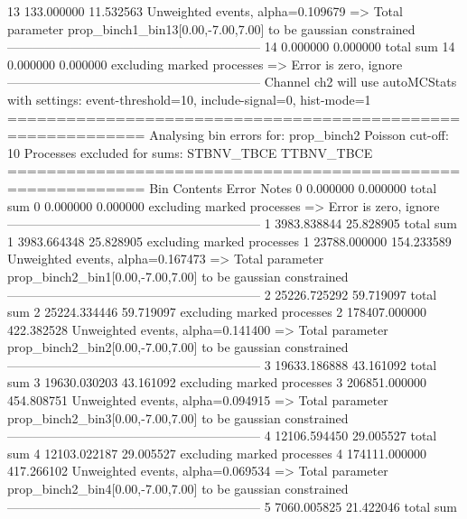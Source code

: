 13         133.000000      11.532563       Unweighted events, alpha=0.109679
  => Total parameter prop_binch1_bin13[0.00,-7.00,7.00] to be gaussian constrained
------------------------------------------------------------
14         0.000000        0.000000        total sum                     
14         0.000000        0.000000        excluding marked processes    
  => Error is zero, ignore      
------------------------------------------------------------
Channel ch2 will use autoMCStats with settings: event-threshold=10, include-signal=0, hist-mode=1
============================================================
Analysing bin errors for: prop_binch2
Poisson cut-off: 10
Processes excluded for sums: STBNV_TBCE TTBNV_TBCE
============================================================
Bin        Contents        Error           Notes                         
0          0.000000        0.000000        total sum                     
0          0.000000        0.000000        excluding marked processes    
  => Error is zero, ignore      
------------------------------------------------------------
1          3983.838844     25.828905       total sum                     
1          3983.664348     25.828905       excluding marked processes    
1          23788.000000    154.233589      Unweighted events, alpha=0.167473
  => Total parameter prop_binch2_bin1[0.00,-7.00,7.00] to be gaussian constrained
------------------------------------------------------------
2          25226.725292    59.719097       total sum                     
2          25224.334446    59.719097       excluding marked processes    
2          178407.000000   422.382528      Unweighted events, alpha=0.141400
  => Total parameter prop_binch2_bin2[0.00,-7.00,7.00] to be gaussian constrained
------------------------------------------------------------
3          19633.186888    43.161092       total sum                     
3          19630.030203    43.161092       excluding marked processes    
3          206851.000000   454.808751      Unweighted events, alpha=0.094915
  => Total parameter prop_binch2_bin3[0.00,-7.00,7.00] to be gaussian constrained
------------------------------------------------------------
4          12106.594450    29.005527       total sum                     
4          12103.022187    29.005527       excluding marked processes    
4          174111.000000   417.266102      Unweighted events, alpha=0.069534
  => Total parameter prop_binch2_bin4[0.00,-7.00,7.00] to be gaussian constrained
------------------------------------------------------------
5          7060.005825     21.422046       total sum                     
